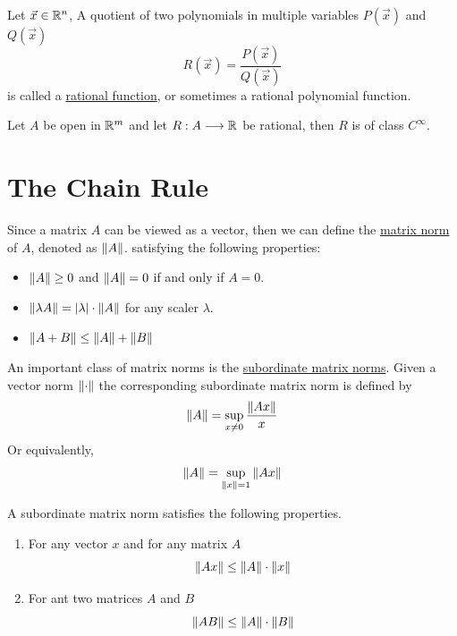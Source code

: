 \begin{definition}
    Let $\vec{x}\in \mathbb{R}^n$, A quotient of two polynomials in multiple variables $P(\overrightarrow{x})$ and $Q(\overrightarrow{x})$
    $$R(\overrightarrow{x})=\frac{P(\overrightarrow{x})}{Q(\overrightarrow{x})}$$
    is called a \underline{rational function}, or sometimes a rational polynomial function.
\end{definition}

\begin{theorem*}\label{rational functions C_infinity}
    Let $A$ be open in $\mathbb{R}^m$ and let $R:A\longrightarrow \mathbb{R}$ be rational, then $R$ is of class $C^{\infty}$.
\end{theorem*}

\section{The Chain Rule}

\begin{definition}
    Since a matrix $A$ can be viewed as a vector, then we can define the \underline{matrix norm} of $A$, denoted as $\left\lVert A \right\rVert$.
    satisfying the following properties:
    \begin{itemize}
        \item $\left\lVert A \right\rVert \geq 0$ and $\left\lVert A \right\rVert=0$ if and only if $A=0$.
        \item $\left\lVert \lambda A \right\rVert=|\lambda|\cdot \left\lVert A \right\rVert$ for any scaler $\lambda$.
        \item $\left\lVert A+B \right\rVert\leq \left\lVert A \right\rVert+\left\lVert B \right\rVert$
    \end{itemize}
\end{definition}


\begin{definition}
    An important class of matrix norms is the \underline{subordinate matrix norms}. Given a vector norm $\left\lVert \cdot \right\rVert$ the corresponding subordinate matrix norm is defined by
    $$\left\lVert A \right\rVert=\sup_{x \neq 0}\frac{\left\lVert Ax \right\rVert}{x}$$
    Or equivalently, $$\left\lVert A \right\rVert=\sup_{\left\lVert x \right\rVert = 1}\left\lVert Ax \right\rVert$$
\end{definition}

\begin{lemma}\label{matrixnorm}
    A subordinate matrix norm satisfies the following properties.
    \begin{enumerate}
        \item For any vector $x$ and for any matrix $A$ $$\left\lVert Ax \right\rVert\leq \left\lVert A \right\rVert\cdot \left\lVert x \right\rVert$$
        \item For ant two matrices $A$ and $B$ $$\left\lVert AB \right\rVert\leq \left\lVert A \right\rVert\cdot \left\lVert B \right\rVert$$
    \end{enumerate}
\end{lemma}


